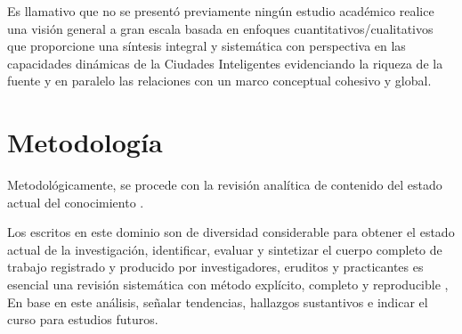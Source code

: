 \documentclass[runningheads,a4paper,spanish]{llncs}
\begin{document}




Es llamativo que no se presentó previamente ningún estudio académico
realice una visión general a gran escala basada en enfoques
cuantitativos/cualitativos que proporcione una síntesis integral y sistemática
con perspectiva en las capacidades dinámicas de la Ciudades Inteligentes
evidenciando la riqueza de la fuente y en paralelo las relaciones con un
marco conceptual cohesivo y global.

\section{Metodología}\label{metodo}

Metodológicamente, se procede con la revisión analítica de contenido del estado
actual del conocimiento \cite{kitchenham_guidelines_2007,webster_analyzing_2002,Wolfswinkel2017}.


Los escritos en este dominio
son de  diversidad considerable
para obtener el estado
actual de la investigación,
identificar, evaluar y sintetizar
el cuerpo completo de trabajo registrado y producido
por investigadores, eruditos y practicantes
es esencial
una revisión sistemática con método explícito, completo y reproducible
\cite{Okoli2015},
En base en este análisis,
señalar tendencias, hallazgos sustantivos
e indicar el curso para estudios futuros.
\end{document}
